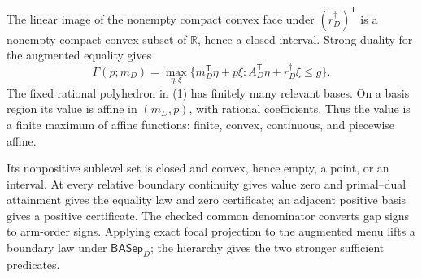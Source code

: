 The linear image of the nonempty compact convex face under \((r_D^\dagger)^{\mathsf T}\) is a nonempty compact convex subset of \(\mathbb R\), hence a closed interval.  Strong duality for the augmented equality gives
\[
\Gamma(p;m_D)=\max_{\eta,\xi}
\{m_D^{\mathsf T}\eta+p\xi:A_D^{\mathsf T}\eta+r_D^\dagger\xi\le g\}.
\tag{1}
\]
The fixed rational polyhedron in (1) has finitely many relevant bases.  On a basis region its value is affine in \((m_D,p)\), with rational coefficients.  Thus the value is a finite maximum of affine functions: finite, convex, continuous, and piecewise affine.

Its nonpositive sublevel set is closed and convex, hence empty, a point, or an interval.  At every relative boundary continuity gives value zero and primal--dual attainment gives the equality law and zero certificate; an adjacent positive basis gives a positive certificate.  The checked common denominator converts gap signs to arm-order signs.  Applying exact focal projection to the augmented menu lifts a boundary law under \(\mathsf{BASep}_D\); the hierarchy gives the two stronger sufficient predicates.